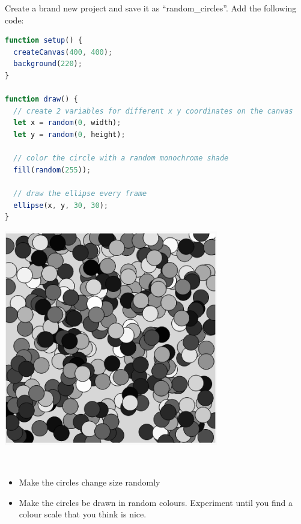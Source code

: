 \begin{exercisebox}[adjusted title= Randomness]
Create a brand new project and save it as ``random\_circles''. Add the following code:
\begin{minipage}{0.60\linewidth}

\begin{lstlisting}[language=JavaScript]
function setup() {
  createCanvas(400, 400);
  background(220);
}

function draw() {
  // create 2 variables for different x y coordinates on the canvas
  let x = random(0, width);
  let y = random(0, height);
  
  // color the circle with a random monochrome shade
  fill(random(255));
  
  // draw the ellipse every frame
  ellipse(x, y, 30, 30);
}

\end{lstlisting}
\end{minipage}

\begin{minipage}{0.40\linewidth}
\includegraphics[width=0.70\textwidth]{illustrationer/randomcircles.png}
\end{minipage}
~
\end{exercisebox}



\begin{exercisebox}[adjusted title=Tasks: ]


\begin{itemize}
\item Make the circles change size randomly
\item Make the circles be drawn in random colours. Experiment until you find a colour scale that you think is nice.
\end{itemize}

\end{exercisebox}

